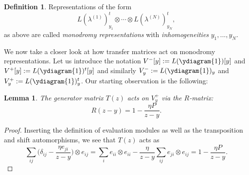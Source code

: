 \documentclass[11pt]{report}
\newtheorem{lemma}[theorem]{Lemma}
\theoremstyle{definition}
\newtheorem{definition}[theorem]{Definition}
\theoremstyle{remark}
\theoremstyle{remark}
\begin{document}
\begin{definition}
Representations of the form
\begin{equation*}
L(\lambda^{(1)})_{y_1}^t \otimes \cdots \otimes L(\lambda^{(N)})_{y_N}^t,
\end{equation*}
as above are called \emph{monodromy representations} with \emph{inhomogeneities} $y_1,...,y_N$.
\end{definition}

We now take a closer look at how transfer matrices act on monodromy representations. Let us introduce the notation $V^-[y] := L(\ydiagram{1})[y]$ and $V^+[y] := L(\ydiagram{1})^t[y]$ and similarly $V_y^- := L(\ydiagram{1})_y$ and $V_y^+ := L(\ydiagram{1})_y^t$. Our starting observation is the following:

\begin{lemma}
The generator matrix $T(z)$ acts on $V_y^+$ via the $R$-matrix:
\begin{equation*}
R(z-y) = 1 - \frac{\eta P}{z-y}.
\end{equation*}
\end{lemma}

\begin{proof}
Inserting the definition of evaluation modules as well as the transposition and shift automorphisms, we see that $T(z)$ acts as
\begin{equation*}
\sum_{ij} \bigg( \delta_{ij} - \frac{\eta e_{ji}}{z-y} \bigg) \otimes e_{ij}
= \sum_{i} e_{ii} \otimes e_{ii} - \frac{\eta}{z-y} \sum_{ij} e_{ji} \otimes e_{ij} = 1 - \frac{\eta P}{z-y}.
\end{equation*}
\end{proof}
\end{document}
